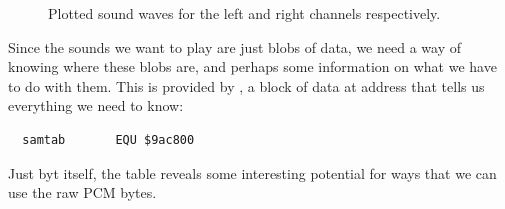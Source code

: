 \begin{figure}[H]
    \centering
    \begin{adjustbox}{width=12cm,center}
      \hspace{0.5cm}
    \end{adjustbox}
  \caption{Plotted sound waves for the left and right channels respectively.}
\end{figure}

Since the sounds we want to play are just blobs of data, we need a way of knowing where these blobs are, and perhaps
some information on what we have to do with them. This is provided by , a block of data at address
 that tells us everything we need to know:

\begin{lstlisting}
  samtab       EQU $9ac800
\end{lstlisting}

Just byt itself, the  table reveals some interesting potential for ways that we can use the
raw PCM bytes. 

